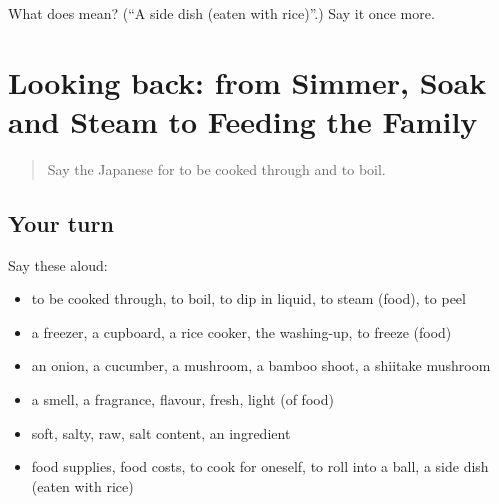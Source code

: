 \begin{tcolorbox}[breakable,colback=teal!4,colframe=teal!35!black,title={Before you move on}]
What does  mean? (\textquotedblleft{}A side dish (eaten with rice)\textquotedblright{}.) Say it once more.
\end{tcolorbox}
\section[(dialogue)]{Looking back: from Simmer, Soak and Steam to Feeding the Family}

\label{lesson:JA-R497-review-492-497}



\begin{quote}
Say the Japanese for to be cooked through and to boil.
\end{quote}

\subsection*{Your turn}
Say these aloud:

\begin{itemize}
\raggedright
  \item to be cooked through, to boil, to dip in liquid, to steam (food), to peel
  \item a freezer, a cupboard, a rice cooker, the washing-up, to freeze (food)
  \item an onion, a cucumber, a mushroom, a bamboo shoot, a shiitake mushroom
  \item a smell, a fragrance, flavour, fresh, light (of food)
  \item soft, salty, raw, salt content, an ingredient
  \item food supplies, food costs, to cook for oneself, to roll into a ball, a side dish (eaten with rice)
\end{itemize}

